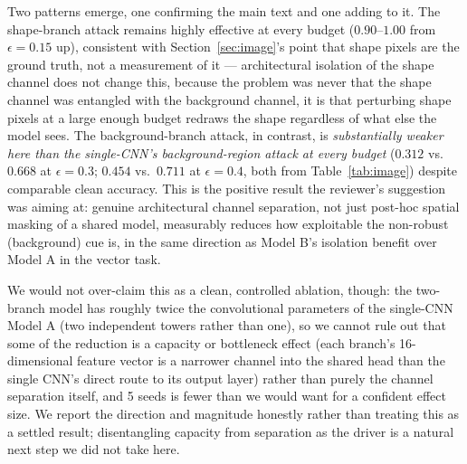 \documentclass[11pt]{article}
\begin{document}
Two patterns emerge, one confirming the main text and one adding to it.
The shape-branch attack remains highly effective at every budget
($0.90$--$1.00$ from $\epsilon=0.15$ up), consistent with
Section~\ref{sec:image}'s point that shape pixels are the ground truth,
not a measurement of it --- architectural isolation of the shape channel
does not change this, because the problem was never that the shape
channel was entangled with the background channel, it is that perturbing
shape pixels at a large enough budget redraws the shape regardless of
what else the model sees. The background-branch attack, in contrast, is
\emph{substantially weaker here than the single-CNN's background-region
attack at every budget} ($0.312$ vs.\ $0.668$ at $\epsilon=0.3$; $0.454$
vs.\ $0.711$ at $\epsilon=0.4$, both from Table~\ref{tab:image}) despite
comparable clean accuracy. This is the positive result the reviewer's
suggestion was aiming at: genuine architectural channel separation, not
just post-hoc spatial masking of a shared model, measurably reduces how
exploitable the non-robust (background) cue is, in the same direction
as Model B's isolation benefit over Model A in the vector task.

We would not over-claim this as a clean, controlled ablation, though: the
two-branch model has roughly twice the convolutional parameters of the
single-CNN Model A (two independent towers rather than one), so we cannot
rule out that some of the reduction is a capacity or bottleneck effect
(each branch's 16-dimensional feature vector is a narrower channel into
the shared head than the single CNN's direct route to its output layer)
rather than purely the channel separation itself, and 5 seeds is fewer
than we would want for a confident effect size. We report the direction
and magnitude honestly rather than treating this as a settled result;
disentangling capacity from separation as the driver is a natural next
step we did not take here.
\end{document}
